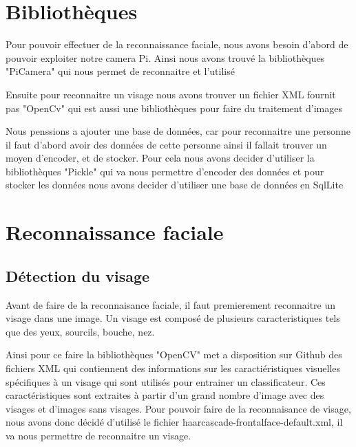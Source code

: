 \documentclass{article}
\begin{document}
\section{Bibliothèques}

Pour pouvoir effectuer de la reconnaissance faciale, nous avons besoin d'abord de pouvoir exploiter notre camera Pi.
Ainsi nous avons trouvé la bibliothèques "PiCamera" qui nous permet de reconnaitre et l'utilisé

Ensuite pour reconnaitre un visage nous avons trouver un fichier XML fournit pas "OpenCv" qui est aussi une bibliothèques
pour faire du traitement d'images

Nous penssions a ajouter une base de données, car pour reconnaitre une personne il faut d'abord avoir des données de cette personne
ainsi il fallait trouver un moyen d'encoder, et de stocker. Pour cela nous avons decider d'utiliser la bibliothèques "Pickle" qui va nous
permettre d'encoder des données et pour stocker les données nous avons decider d'utiliser une base de données en SqlLite



\section{Reconnaissance faciale}

\subsection{Détection du visage}

Avant de faire de la reconnaisance faciale, il faut premierement reconnaitre un visage dans une image. 
Un visage est composé de plusieurs caracteristiques tels que des yeux, sourcils, bouche, nez.

Ainsi pour ce faire la bibliothèques "OpenCV" met a disposition sur Github des fichiers XML qui contiennent des informations sur les caractiéristiques visuelles spécifiques
à un visage qui sont utilisés pour entrainer un classificateur. Ces caractéristiques sont extraites à partir d'un grand nombre d'image avec des visages et d'images sans visages.
Pour pouvoir faire de la reconnaisance de visage, nous avons donc décidé d'utilisé le fichier haarcascade-frontalface-default.xml, il va nous
permettre de reconnaitre un visage.
\end{document}
